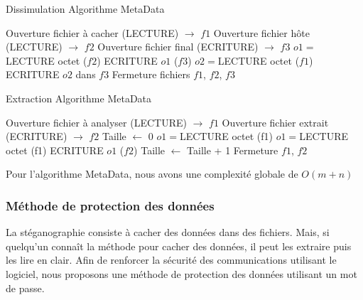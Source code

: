 \documentclass[11pt]{article}
\begin{document}
\begin{minipage}{.5\textwidth}
\begin{algorithm}[H]
\caption{Dissimulation Algorithme MetaData}
\begin{algorithmic}
\STATE \footnotesize Ouverture fichier à cacher (LECTURE) $\rightarrow$ $f1$
\STATE Ouverture fichier hôte (LECTURE) $\rightarrow$ $f2$
\STATE Ouverture fichier final (ECRITURE) $\rightarrow$ $f3$
\STATE $o1 = $LECTURE octet ($f2$)
\STATE ECRITURE $o1$ ($f3$)
\STATE $o2 = $LECTURE octet ($f1$)
\STATE ECRITURE $o2$ dans $f3$
\ENDWHILE
\ENDIF
\ENDWHILE
\STATE Fermeture fichiers $f1$, $f2$, $f3$
\end{algorithmic}
\end{algorithm}
\normalsize
\end{minipage}
\begin{minipage}{.5\textwidth}
\begin{algorithm}[H]
\caption{Extraction Algorithme MetaData}
\begin{algorithmic}
\STATE \footnotesize Ouverture fichier à analyser (LECTURE) $\rightarrow$ $f1$
\STATE Ouverture fichier extrait (ECRITURE) $\rightarrow$ $f2$
\STATE Taille $\leftarrow$ 0
\STATE $o1 = $LECTURE octet (f1)
\STATE $o1 = $LECTURE octet (f1)
\STATE ECRITURE $o1$ ($f2$)
\STATE Taille $\leftarrow$ Taille + 1
\ENDWHILE
\ENDIF
\ENDWHILE
\STATE Fermeture $f1$, $f2$
\end{algorithmic}
\end{algorithm}
\normalsize
\end{minipage}


Pour l'algorithme MetaData, nous avons une complexité globale de 
$O(m+n)$

\subsubsection{Méthode de protection des données}

La stéganographie consiste à cacher des données dans des fichiers. Mais, 
si quelqu'un connaît la méthode pour cacher des données, il peut les extraire 
puis les lire en clair. 
Afin de renforcer la sécurité des communications utilisant le logiciel, 
nous proposons une méthode de protection des données utilisant un mot de passe. 
\end{document}
